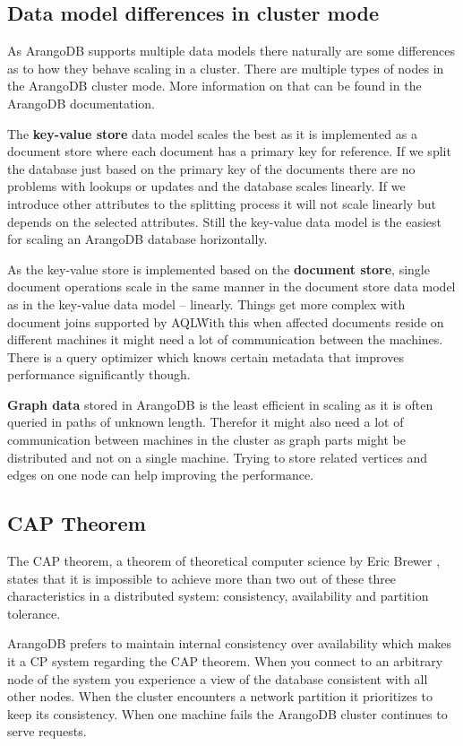 \subsection{Data model differences in cluster mode}
As ArangoDB supports multiple data models there naturally are some differences as to how they behave scaling in a cluster. There are multiple types of nodes in the ArangoDB cluster mode. More information on that can be found in the ArangoDB documentation.
\medskip

The \textbf{key-value store} data model scales the best as it is implemented as a document store where each document has a primary key for reference. If we split the database just based on the primary key of the documents there are no problems with lookups or updates and the database scales linearly. If we introduce other attributes to the splitting process it will not scale linearly but depends on the selected attributes. Still the key-value data model is the easiest for scaling an ArangoDB database horizontally.
\medskip

As the key-value store is implemented based on the \textbf{document store}, single document operations scale in the same manner in the document store data model as in the key-value data model -- linearly. Things get more complex with document joins supported by AQL\. With this when affected documents reside on different machines it might need a lot of communication between the machines. There is a query optimizer which knows certain metadata that improves performance significantly though.
\medskip

\textbf{Graph data} stored in ArangoDB is the least efficient in scaling as it is often queried in paths of unknown length. Therefor it might also need a lot of communication between machines in the cluster as graph parts might be distributed and not on a single machine. Trying to store related vertices and edges on one node can help improving the performance.
\parencite{ArangoCluster}

\subsection{CAP Theorem}
The CAP theorem, a theorem of theoretical computer science by Eric Brewer \parencite{Brewer2000}, states that it is impossible to achieve more than two out of these three characteristics in a distributed system: consistency, availability and partition tolerance.

ArangoDB prefers to maintain internal consistency over availability which makes it a CP system regarding the CAP theorem. When you connect to an arbitrary node of the system you experience a view of the database consistent with all other nodes. When the cluster encounters a network partition it prioritizes to keep its consistency. When one machine fails the ArangoDB cluster continues to serve requests.
\parencite{ArangoCluster}

